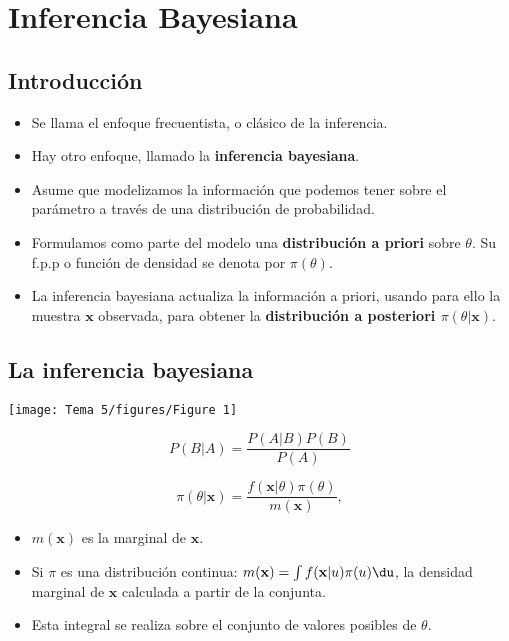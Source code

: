 \section{Inferencia Bayesiana}
\subsection{Introducción}
\begin{tcolorbox}[colback=blue!5!white, colframe=blue!75!black, title=\textbf{Lo que hemos visto hasta el momento:}]
\begin{itemize}[label=\textbullet]
    \item Se llama el enfoque frecuentista, o clásico de la inferencia.
    \item Hay otro enfoque, llamado la \textbf{inferencia bayesiana}. 
\end{itemize}
\end{tcolorbox}
\begin{tcolorbox}[colback=blue!5!white, colframe=blue!75!black, title=\textbf{La inferencia bayesiana}]
\begin{itemize}[label=\textbullet]
    \item Asume que modelizamos la información que podemos tener sobre el parámetro a través de una distribución de probabilidad.
    \item Formulamos como parte del modelo una \textbf{distribución a priori} sobre $\theta$. Su f.p.p o función de densidad se denota por  $\pi(\theta)$.
    \item La inferencia bayesiana actualiza la información a priori, usando para ello la muestra $\mathbf{x}$ observada, para obtener la \textbf{distribución a posteriori $\pi(\theta|\mathbf{x})$}.
\end{itemize}
\end{tcolorbox}
\subsection{La inferencia bayesiana}
\begin{center}
    \texttt{[image: Tema 5/figures/Figure 1]}
\end{center}
\begin{tcolorbox}[colback=olive!5!white, colframe=olive!75!black, title=\textbf{Fórmula de Bayes}]
\[
P(B|A)=\dfrac{P(A|B)P(B)}{P(A)}
\] 
\end{tcolorbox}
\begin{tcolorbox}[colback=blue!5!white, colframe=blue!75!black, title=\textbf{Para distribuciones condicionadas:}]
\[
\pi(\theta|\mathbf{x})=\dfrac{f(\mathbf{x}|\theta)\pi(\theta)}{m(\mathbf{x})},
\] 
\begin{itemize}[label=\textbullet]
    \item $m(\mathbf{x})$ es la marginal de $\mathbf{x}$.
    \item Si $\pi$ es una distribución continua: $m(\mathbf{x})=\int f(\mathbf{x}|u)\pi(u)\du $, la densidad marginal de $\mathbf{x}$ calculada a partir de la conjunta.
    \item Esta integral se realiza sobre el conjunto de valores posibles de $\theta$.
\end{itemize}
\end{tcolorbox}
